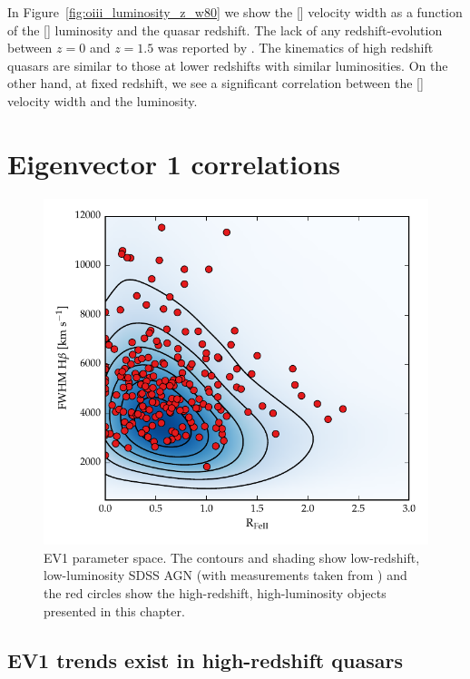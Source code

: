 In Figure~\ref{fig:oiii_luminosity_z_w80} we show the [] velocity width as a function of the [] luminosity and the quasar redshift. 
The lack of any redshift-evolution between $z=0$ and $z=1.5$ was reported by \citet{harrison16}.
The kinematics of high redshift quasars are similar to those at lower redshifts with similar luminosities. 
On the other hand, at fixed redshift, we see a significant correlation between the [] velocity width and the luminosity. 

\section{Eigenvector 1 correlations}

\begin{figure}[t!]
    \includegraphics[width=\columnwidth]{figures/chapter04/ev1_lowz.pdf} 
    \caption[{EV1 parameter space.}]{EV1 parameter space. The contours and shading show low-redshift, low-luminosity SDSS AGN (with measurements taken from \citet{shen11}) and the red circles show the high-redshift, high-luminosity objects presented in this chapter.}      
    \label{fig:ev1_lowz}
\end{figure}

\subsection{EV1 trends exist in high-redshift quasars}

